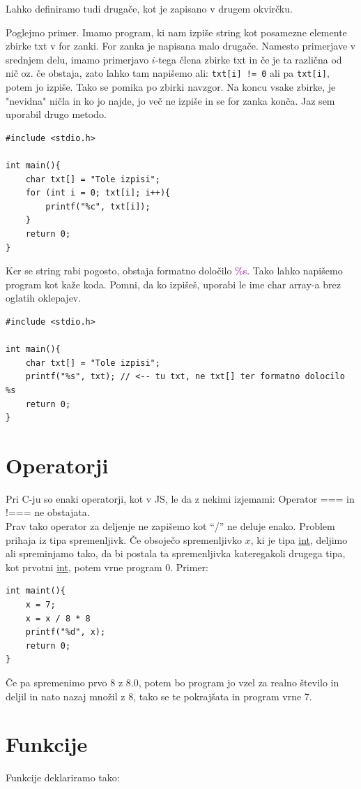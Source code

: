 \documentclass[a4paper, 12pt]{article}
\begin{document}
Lahko definiramo tudi drugače, kot je zapisano v drugem okvirčku.

Poglejmo primer. Imamo program, ki nam izpiše string kot posamezne elemente zbirke txt v for zanki. For zanka je napisana malo drugače. Namesto primerjave v srednjem delu, imamo primerjavo $i$-tega člena zbirke txt in če je ta različna od nič oz. če obstaja, zato lahko tam napišemo ali: \texttt{txt[i] != 0} ali pa \texttt{txt[i]}, potem jo izpiše. Tako se pomika po zbirki navzgor. Na koncu vsake zbirke, je "nevidna" ničla in ko jo najde, jo več ne izpiše in se for zanka konča. Jaz sem uporabil drugo metodo.

\begin{lstlisting}
#include <stdio.h>

int main(){
	char txt[] = "Tole izpisi";
	for (int i = 0; txt[i]; i++){
		printf("%c", txt[i]);
	}
	return 0;
}
\end{lstlisting}

Ker se string rabi pogosto, obstaja formatno določilo \textcolor{purple}{\%s}. Tako lahko napišemo program kot kaže koda. Pomni, da ko izpišeš, uporabi le ime char array-a brez oglatih oklepajev.

\begin{lstlisting}
#include <stdio.h>

int main(){
	char txt[] = "Tole izpisi";
	printf("%s", txt); // <-- tu txt, ne txt[] ter formatno dolocilo %s
	return 0;
}
\end{lstlisting}

\section{Operatorji}
Pri C-ju so enaki operatorji, kot v JS, le da z nekimi izjemami: Operator === in !=== ne obstajata.\\
Prav tako operator za deljenje ne zapišemo kot ``/'' ne deluje enako. Problem prihaja iz tipa spremenljivk. Če obsoječo spremenljivko $x$, ki je tipa \underline{int}, deljimo ali spreminjamo tako, da bi postala ta spremenljivka kateregakoli drugega tipa, kot prvotni \underline{int}, potem vrne program 0. Primer:
\begin{lstlisting}
int maint(){	
	x = 7;
	x = x / 8 * 8
	printf("%d", x);
	return 0;
}
\end{lstlisting}
Če pa spremenimo prvo 8 z 8.0, potem bo program jo vzel za realno število in deljil in nato nazaj množil z 8, tako se te pokrajšata in program vrne 7.

\section{Funkcije}
Funkcije deklariramo tako:
\end{document}

